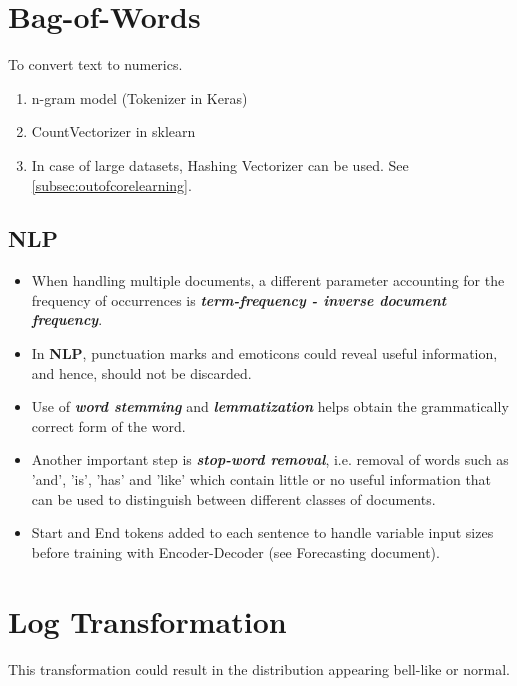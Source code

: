 \documentclass[a4paper, 12pt]{report}
\begin{document}
\section{Bag-of-Words}
To convert text to numerics.
\begin{enumerate}
\item n-gram model ({\color{cyan}Tokenizer in Keras})
\item {\color{cyan}CountVectorizer in sklearn}
\item In case of large datasets, Hashing Vectorizer can be used. See  \autoref{subsec:outofcorelearning}.
\end{enumerate}

\subsection{NLP}
\begin{itemize}

\item When handling multiple documents, a different parameter accounting for the frequency of occurrences is \textbf{\textit{term-frequency - inverse document frequency}}.

\item In \textbf{NLP}, punctuation marks and emoticons could reveal useful information, and hence, should not be discarded.

\item Use of \textbf{\textit{word stemming}} and \textbf{\textit{lemmatization}} helps obtain the grammatically correct form of the word.

\item Another important step is \textbf{\textit{stop-word removal}}, i.e. removal of words such as 'and', 'is', 'has' and 'like' which contain little or no useful information that can be used to distinguish between different classes of documents.

\item Start and End tokens added to each sentence to handle variable input sizes before training with Encoder-Decoder (see Forecasting document).

\end{itemize}

\section{Log Transformation}
This transformation could result in the distribution appearing bell-like or normal.
\end{document}
